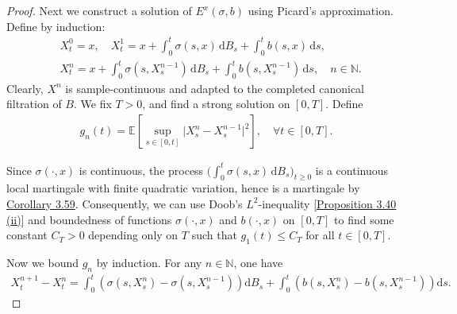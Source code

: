 \documentclass{article}
\numberwithin{equation}{section}
\newcommand{\E}{\mathbb{E}}
\renewcommand{\d}{\mathrm{d}}
\theoremstyle{plain}
\theoremstyle{definition}
\begin{document}
\begin{proof}
Next we construct a solution of $E^x(\sigma,b)$ using Picard's approximation. Define by induction:
\begin{align*}
	&X_t^0=x,\quad X_t^1=x+\int_0^t\sigma(s,x)\,\d B_s + \int_0^t b(s,x)\,\d s,\\
	&X_t^n=x+\int_0^t\sigma(s,X_s^{n-1})\,\d B_s + \int_0^t b(s,X_s^{n-1})\,\d s,\quad n\in\mathbb{N}.
\end{align*}
Clearly, $X^n$ is sample-continuous and adapted to the completed canonical filtration of $B$. We fix $T>0$, and find a strong solution on $[0,T]$. Define
\begin{align*}
	g_n(t)=\E\left[\sup_{s\in[0,t]}\vert X_s^n-X_s^{n-1}\vert^2\right],\quad\forall t\in[0,T].
\end{align*}

Since $\sigma(\cdot,x)$ is continuous, the process $\bigl(\int_0^t\sigma(s,x)\,\d B_s\bigr)_{t\geq 0}$ is a continuous local martingale with finite quadratic variation, hence is a martingale by \hyperref[cor:3.59]{Corollary 3.59}. Consequently, we can use Doob's $L^2$-inequality [\hyperref[prop:3.40]{Proposition 3.40 (ii)}] and boundedness of functions $\sigma(\cdot,x)$ and $b(\cdot,x)$ on $[0,T]$ to find some constant $C_T>0$ depending only on $T$ such that $g_1(t)\leq C_T$ for all $t\in[0,T]$.

Now we bound $g_n$ by induction. For any $n\in\mathbb{N}$, one have
\begin{align*}
	X_t^{n+1}-X_t^n=\int_0^t\left(\sigma(s,X_s^n)-\sigma(s,X_s^{n-1})\right)\d B_s + \int_0^t\left(b(s,X_s^n)-b(s,X_s^{n-1})\right)\d s.
\end{align*}


\end{proof}
\end{document}

